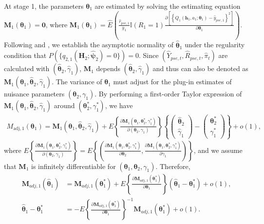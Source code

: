 \documentclass[12pt]{article}
\begin{document}
At stage 1, the parameters $\bm{\theta}_1$ are estimated by solving the estimating equation $\bm{M}_1(\bm{\theta}_1) = \bm{0}$, where $\bm{M}_1(\bm{\theta}_1) = \widehat{E} \left(\frac{\widehat{r}_{pse,1}}{\widehat{\pi}_{1}} \mathbb{I}(R_{1}=1) \frac{\partial \left[ \left\{ Q_1(\bm{h}_1,a_1;\bm{\theta}_1) - \widehat{y}_{pse,1}  \right\}^2\right]}{\partial \bm{\theta}_1} \right)$. Following \cite{wallace2015doubly}  and \cite{Simoneau_et_al_2020}, we establish the asymptotic normality of $\widehat{\bm{\theta}}_1$ under the regularity condition that $P(\{q_{2,1}(\bm{H}_2; \widehat{\bm{\psi}}_2) = 0\})=0$. 
Since $(\widehat{Y}_{pse,t},\widehat{R}_{pse,t},\widehat{\pi}_t)$ are calculated with $(\widehat{\bm{\theta}}_2,\widehat{\gamma}_1)$, $\bm{M}_1$ depends $(\widehat{\bm{\theta}}_2,\widehat{\gamma}_1)$ and thus can also be denoted as $\bm{M}_1(\bm{\theta}_1, \widehat{\bm{\theta}}_2,\widehat{\gamma}_1)$. The variance of $\bm{\theta}_1$ must adjust for the plug-in estimates of nuisance parameters $(\bm{\theta}_2,\gamma_1)$. By performing a first-order Taylor expression of $\bm{M}_1(\bm{\theta}_1, \widehat{\bm{\theta}}_2,\widehat{\gamma}_1)$ around $(\bm{\theta}_2^*,\gamma_1^*)$, we have
\begin{align*}
    M_{\mathrm{adj}, 1}(\bm{\theta}_1) = \bm{M}_1(\bm{\theta}_1, \widehat{\bm{\theta}}_2,\widehat{\gamma}_1) + E\left\{ \frac{\partial \bm{M}_1(\bm{\theta}_1, \bm{\theta}_2^*,\gamma_1^*)}{\partial (\bm{\theta}_2,\gamma_1)} \right\}
    \left\{\left(\begin{array}{l}
\widehat{\bm{\theta}}_2 \\
\widehat{\gamma}_1
\end{array}\right)-\left(\begin{array}{l}
\bm{\theta}_2^* \\
\gamma_1^*
\end{array}\right)\right\}+ o(1),
\end{align*}
where $
    E\left\{ \frac{\partial \bm{M}_1(\bm{\theta}_1, \bm{\theta}_2^*,\gamma_1^*)}{\partial (\bm{\theta}_2,\gamma_1)} \right\} = E\left\{ \left( \frac{\partial \bm{M}_1(\bm{\theta}_1, \bm{\theta}_2^*,\gamma_1^*)}{\partial \bm{\theta}_2} , \frac{\partial \bm{M}_1(\bm{\theta}_1, \bm{\theta}_2^*,\gamma_1^*)}{\partial \gamma_1}  \right) \right\}
$, and we assume that $\bm{M}_1$ is infinitely differentiable for $(\bm{\theta}_1,\bm{\theta}_2,\gamma_1)$. Therefore, 
\begin{align*}
    \bm{M}_{adj,1}(\widehat{\bm{\theta}}_1) &= \bm{M}_{adj,1}(\bm{\theta}_1^*) + E\left\{\frac{\partial \bm{M}_{adj,1}(\bm{\theta}_1^*)}{\partial \bm{\theta}_1}\right\}(\widehat{\bm{\theta}}_1 - \bm{\theta}_1^*) + o(1),\\
    \widehat{\bm{\theta}}_1 - \bm{\theta}_1^* &= -E\left\{\frac{\partial \bm{M}_{adj,1}(\bm{\theta}_1^*)}{\partial \bm{\theta}_1}\right\}^{-1}\bm{M}_{adj,1}(\bm{\theta}_1^*)+ o(1).
\end{align*}
\end{document}
